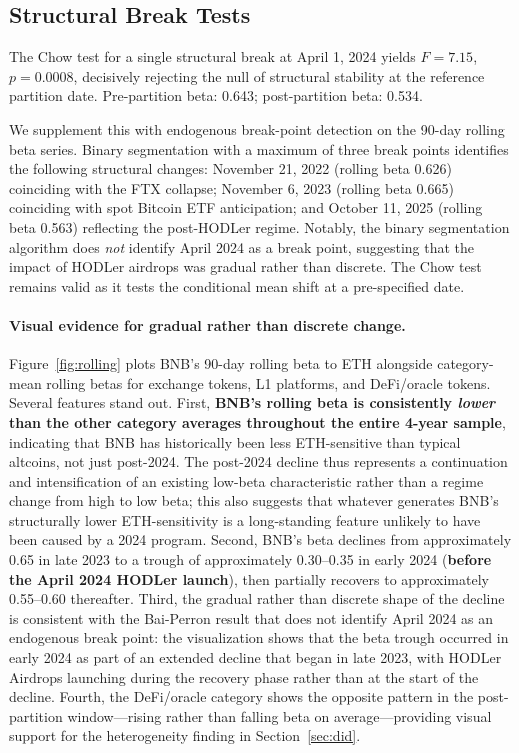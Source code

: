\documentclass[11pt,a4paper]{article}
\begin{document}
\subsection{Structural Break Tests} \label{sec:struct}

The Chow test for a single structural break at April 1, 2024 yields $F = 7.15$, $p = 0.0008$, decisively rejecting the null of structural stability at the reference partition date. Pre-partition beta: 0.643; post-partition beta: 0.534.

We supplement this with endogenous break-point detection on the 90-day rolling beta series. Binary segmentation with a maximum of three break points identifies the following structural changes: November 21, 2022 (rolling beta 0.626) coinciding with the FTX collapse; November 6, 2023 (rolling beta 0.665) coinciding with spot Bitcoin ETF anticipation; and October 11, 2025 (rolling beta 0.563) reflecting the post-HODLer regime. Notably, the binary segmentation algorithm does \emph{not} identify April 2024 as a break point, suggesting that the impact of HODLer airdrops was gradual rather than discrete. The Chow test remains valid as it tests the conditional mean shift at a pre-specified date.

\paragraph{Visual evidence for gradual rather than discrete change.} Figure~\ref{fig:rolling} plots BNB's 90-day rolling beta to ETH alongside category-mean rolling betas for exchange tokens, L1 platforms, and DeFi/oracle tokens. Several features stand out. First, \textbf{BNB's rolling beta is consistently \emph{lower} than the other category averages throughout the entire 4-year sample}, indicating that BNB has historically been less ETH-sensitive than typical altcoins, not just post-2024. The post-2024 decline thus represents a continuation and intensification of an existing low-beta characteristic rather than a regime change from high to low beta; this also suggests that whatever generates BNB's structurally lower ETH-sensitivity is a long-standing feature unlikely to have been caused by a 2024 program. Second, BNB's beta declines from approximately 0.65 in late 2023 to a trough of approximately 0.30--0.35 in early 2024 (\textbf{before the April 2024 HODLer launch}), then partially recovers to approximately 0.55--0.60 thereafter. Third, the gradual rather than discrete shape of the decline is consistent with the Bai-Perron result that does not identify April 2024 as an endogenous break point: the visualization shows that the beta trough occurred in early 2024 as part of an extended decline that began in late 2023, with HODLer Airdrops launching during the recovery phase rather than at the start of the decline. Fourth, the DeFi/oracle category shows the opposite pattern in the post-partition window---rising rather than falling beta on average---providing visual support for the heterogeneity finding in Section~\ref{sec:did}.
\end{document}

